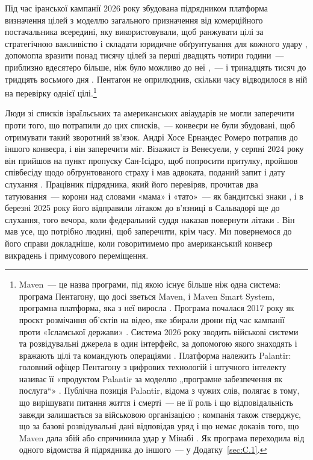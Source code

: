 Під час іранської кампанії 2026 року збудована підрядником платформа визначення цілей з моделлю загального призначення від комерційного постачальника всередині, яку використовували, щоб ранжувати цілі за стратегічною важливістю і складати юридичне обґрунтування для кожного удару \autocite{livingstone2026maven}, допомогла вразити понад тисячу цілей за перші двадцять чотири години~— приблизно вдесятеро більше, ніж було можливо до неї \autocite{csis2026maven},~— і тринадцять тисяч до тридцять восьмого дня \autocite{breakingdefense2026maven}. Пентагон не оприлюднив, скільки часу відводилося в ній на перевірку однієї цілі.\footnote{Maven~— це назва програми, під якою існує більше ніж одна система: програма Пентагону, що досі зветься Maven, і Maven Smart System, програмна платформа, яка з неї виросла \autocite{csis2026maven}. Програма почалася 2017 року як проєкт розмічання об’єктів на відео, яке збирали дрони під час кампанії проти «Ісламської держави» \autocite{weisgerber2017maven,fang2019maven}. Система 2026 року зводить військові системи та розвідувальні джерела в один інтерфейс, за допомогою якого знаходять і вражають цілі та командують операціями \autocite{defensescoop2026transition}. Платформа належить Palantir: головний офіцер Пентагону з цифрових технологій і штучного інтелекту називає її «продуктом Palantir за моделлю „програмне забезпечення як послуга“» \autocite{defensescoop2026transition}. Публічна позиція Palantir, відома з чужих слів, полягає в тому, що вирішувати питання життя і смерті~— не її роль і що відповідальність завжди залишається за військовою організацією \autocite{lee2026palantir}; компанія також стверджує, що за базові розвідувальні дані відповідав уряд і що немає доказів того, що Maven дала збій або спричинила удар у Мінабі \autocite{Bloomberg2026KillChain}. Як програма переходила від одного відомства й підрядника до іншого~— у Додатку~\ref{sec:C.1}.}

Люди зі списків ізраїльських та американських авіаударів не могли заперечити проти того, що потрапили до цих списків,~— конвеєри не були збудовані, щоб отримувати такий зворотний зв’язок. Андрі Хосе Ернандес Ромеро потрапив до іншого конвеєра, і він заперечити міг. Візажист із Венесуели, у серпні 2024 року він прийшов на пункт пропуску Сан-Ісідро, щоб попросити притулку, пройшов співбесіду щодо обґрунтованого страху і мав адвоката, поданий запит і дату слухання \autocite{LULAC2025HernandezRomero,Vega2025HernandezRomero}. Працівник підрядника, який його перевіряв, прочитав два татуювання~— корони над словами «мама» і «тато»~— як бандитські знаки \autocite{Palomera2025Blade}, і в березні 2025 року його відправили літаком до в’язниці в Сальвадорі ще до слухання, того вечора, коли федеральний суддя наказав повернути літаки \autocite{jgg2025contempt}. Він мав усе, що потрібно людині, щоб заперечити, крім часу. Ми повернемося до його справи докладніше, коли говоритимемо про американський конвеєр викрадень і примусового переміщення.

